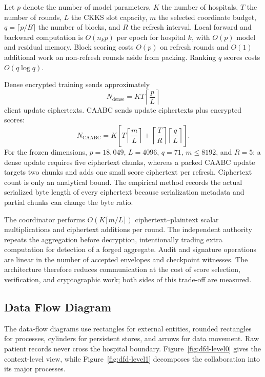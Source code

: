 Let $p$ denote the number of model parameters, $K$ the number of hospitals, $T$ the number of rounds, $L$ the CKKS slot capacity, $m$ the selected coordinate budget, $q=\lceil p/B\rceil$ the number of blocks, and $R$ the refresh interval. Local forward and backward computation is $O(n_kp)$ per epoch for hospital $k$, with $O(p)$ model and residual memory. Block scoring costs $O(p)$ on refresh rounds and $O(1)$ additional work on non-refresh rounds aside from packing. Ranking $q$ scores costs $O(q\log q)$.

Dense encrypted training sends approximately
\begin{equation}
    N_{\mathrm{dense}}=KT\left\lceil\frac{p}{L}\right\rceil
    \label{eq:dense-cipher-count}
\end{equation}
client update ciphertexts. CAABC sends update ciphertexts plus encrypted scores:
\begin{equation}
    N_{\mathrm{CAABC}}=K\left[
    T\left\lceil\frac{m}{L}\right\rceil+
    \left\lceil\frac{T}{R}\right\rceil
    \left\lceil\frac{q}{L}\right\rceil
    \right].
    \label{eq:caabc-cipher-count}
\end{equation}
For the frozen dimensions, $p=18{,}049$, $L=4096$, $q=71$, $m\leq8192$, and $R=5$: a dense update requires five ciphertext chunks, whereas a packed CAABC update targets two chunks and adds one small score ciphertext per refresh. Ciphertext count is only an analytical bound. The empirical method records the actual serialized byte length of every ciphertext because serialization metadata and partial chunks can change the byte ratio.

The coordinator performs $O(K\lceil m/L\rceil)$ ciphertext--plaintext scalar multiplications and ciphertext additions per round. The independent authority repeats the aggregation before decryption, intentionally trading extra computation for detection of a forged aggregate. Audit and signature operations are linear in the number of accepted envelopes and checkpoint witnesses. The architecture therefore reduces communication at the cost of score selection, verification, and cryptographic work; both sides of this trade-off are measured.

\subsection{Data Flow Diagram}
\label{subsec:data-flow}

The data-flow diagrams use rectangles for external entities, rounded rectangles for processes, cylinders for persistent stores, and arrows for data movement. Raw patient records never cross the hospital boundary. Figure~\ref{fig:dfd-level0} gives the context-level view, while Figure~\ref{fig:dfd-level1} decomposes the collaboration into its major processes.

